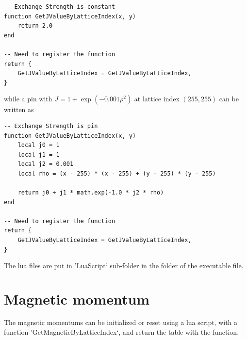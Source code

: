 \documentclass[aps,superscriptaddress,groupedaddress]{revtex4}  %
\begin{document}
\begin{lstlisting}
-- Exchange Strength is constant
function GetJValueByLatticeIndex(x, y)
    return 2.0
end

-- Need to register the function
return {
    GetJValueByLatticeIndex = GetJValueByLatticeIndex,
}
\end{lstlisting}
while a pin with $J=1+\exp \left(-0.001 \rho ^2\right)$ at lattice index $(255, 255)$ can be written as
\begin{lstlisting}
-- Exchange Strength is pin
function GetJValueByLatticeIndex(x, y)
    local j0 = 1
    local j1 = 1
    local j2 = 0.001
    local rho = (x - 255) * (x - 255) + (y - 255) * (y - 255)

    return j0 + j1 * math.exp(-1.0 * j2 * rho)
end

-- Need to register the function
return {
    GetJValueByLatticeIndex = GetJValueByLatticeIndex,
}
\end{lstlisting}

The lua files are put in 'LuaScript` sub-folder in the folder of the executable file. 

\section{\label{sec:3}Magnetic momentum}

The magnetic momentums can be initialized or reset using a lua script, with a function 'GetMagneticByLatticeIndex`, and return the table with the function.
\end{document}
